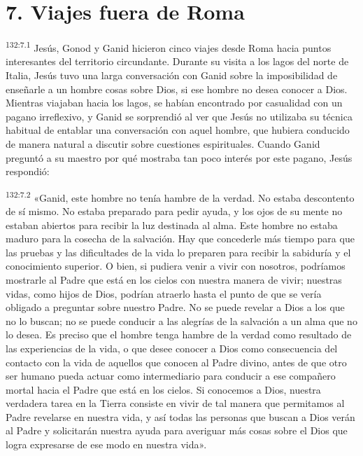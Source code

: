 \section*{7. Viajes fuera de Roma}
\par
\textsuperscript{132:7.1} Jesús, Gonod y Ganid hicieron cinco viajes desde Roma hacia puntos interesantes del territorio circundante. Durante su visita a los lagos del norte de Italia, Jesús tuvo una larga conversación con Ganid sobre la imposibilidad de enseñarle a un hombre cosas sobre Dios, si ese hombre no desea conocer a Dios. Mientras viajaban hacia los lagos, se habían encontrado por casualidad con un pagano irreflexivo, y Ganid se sorprendió al ver que Jesús no utilizaba su técnica habitual de entablar una conversación con aquel hombre, que hubiera conducido de manera natural a discutir sobre cuestiones espirituales. Cuando Ganid preguntó a su maestro por qué mostraba tan poco interés por este pagano, Jesús respondió:

\par
\textsuperscript{132:7.2} «Ganid, este hombre no tenía hambre de la verdad. No estaba descontento de sí mismo. No estaba preparado para pedir ayuda, y los ojos de su mente no estaban abiertos para recibir la luz destinada al alma. Este hombre no estaba maduro para la cosecha de la salvación. Hay que concederle más tiempo para que las pruebas y las dificultades de la vida lo preparen para recibir la sabiduría y el conocimiento superior. O bien, si pudiera venir a vivir con nosotros, podríamos mostrarle al Padre que está en los cielos con nuestra manera de vivir; nuestras vidas, como hijos de Dios, podrían atraerlo hasta el punto de que se vería obligado a preguntar sobre nuestro Padre. No se puede revelar a Dios a los que no lo buscan; no se puede conducir a las alegrías de la salvación a un alma que no lo desea. Es preciso que el hombre tenga hambre de la verdad como resultado de las experiencias de la vida, o que desee conocer a Dios como consecuencia del contacto con la vida de aquellos que conocen al Padre divino, antes de que otro ser humano pueda actuar como intermediario para conducir a ese compañero mortal hacia el Padre que está en los cielos. Si conocemos a Dios, nuestra verdadera tarea en la Tierra consiste en vivir de tal manera que permitamos al Padre revelarse en nuestra vida, y así todas las personas que buscan a Dios verán al Padre y solicitarán nuestra ayuda para averiguar más cosas sobre el Dios que logra expresarse de ese modo en nuestra vida».

